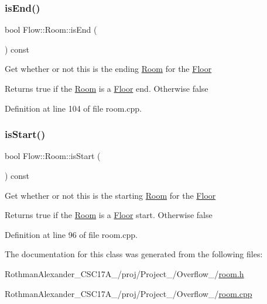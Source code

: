 \subsubsection{\texorpdfstring{is\+End()}{isEnd()}}
{\footnotesize\ttfamily bool Flow\+::\+Room\+::is\+End (\begin{DoxyParamCaption}{ }\end{DoxyParamCaption}) const}

Get whether or not this is the ending \hyperlink{class_flow_1_1_room}{Room} for the \hyperlink{class_flow_1_1_floor}{Floor} \begin{DoxyReturn}{Returns}
true if the \hyperlink{class_flow_1_1_room}{Room} is a \hyperlink{class_flow_1_1_floor}{Floor} end. Otherwise false 
\end{DoxyReturn}


Definition at line 104 of file room.\+cpp.

\hypertarget{class_flow_1_1_room_ad5fe3a89b1a14b1619f920f624953ff6}{}\label{class_flow_1_1_room_ad5fe3a89b1a14b1619f920f624953ff6} 
\subsubsection{\texorpdfstring{is\+Start()}{isStart()}}
{\footnotesize\ttfamily bool Flow\+::\+Room\+::is\+Start (\begin{DoxyParamCaption}{ }\end{DoxyParamCaption}) const}

Get whether or not this is the starting \hyperlink{class_flow_1_1_room}{Room} for the \hyperlink{class_flow_1_1_floor}{Floor} \begin{DoxyReturn}{Returns}
true if the \hyperlink{class_flow_1_1_room}{Room} is a \hyperlink{class_flow_1_1_floor}{Floor} start. Otherwise false 
\end{DoxyReturn}


Definition at line 96 of file room.\+cpp.



The documentation for this class was generated from the following files\+:\begin{DoxyCompactItemize}
\item 
Rothman\+Alexander\+\_\+\+C\+S\+C17\+A\+\_/proj/\+Project\+\_/\+Overflow\+\_/\hyperlink{room_8h}{room.\+h}\item 
Rothman\+Alexander\+\_\+\+C\+S\+C17\+A\+\_/proj/\+Project\+\_/\+Overflow\+\_/\hyperlink{room_8cpp}{room.\+cpp}\end{DoxyCompactItemize}
